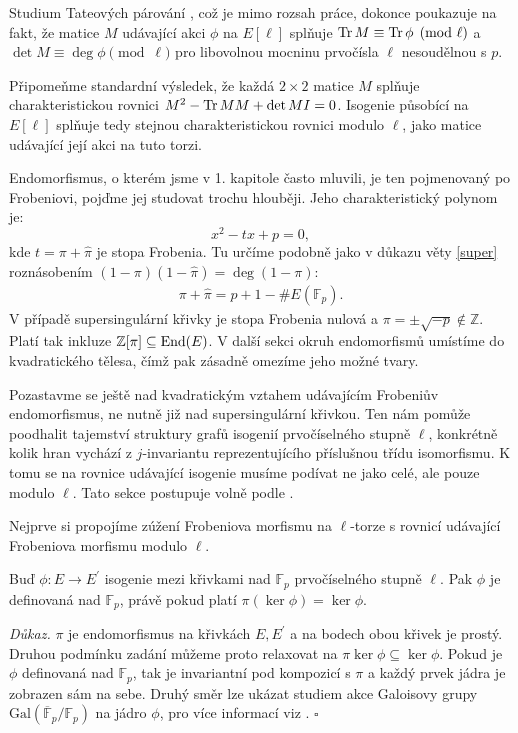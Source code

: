 \documentclass[12pt]{report}
\begin{document}
Studium Tateových párování \cite[Prop. III.8.6., Prop. V.2.3.]{Silverman}, což je mimo rozsah práce, dokonce poukazuje na fakt, že matice $M$ udávající akci $\phi$ na $E[\ell]$ splňuje $\operatorname{Tr} M \equiv \operatorname{Tr} \phi \pmod{\ell}$ a $\det M \equiv \deg \phi \pmod{\ell}$ pro libovolnou mocninu prvočísla $\ell$ nesoudělnou s $p$.

Připomeňme standardní výsledek, že každá $2 \times 2$ matice $M$ splňuje charakteristickou rovnici $M^2 - \operatorname{Tr} M M + \det M I = 0$. Isogenie působící na $E[\ell]$ splňuje tedy stejnou charakteristickou rovnici modulo $\ell$, jako matice udávající její akci na tuto torzi.

Endomorfismus, o kterém jsme v 1. kapitole často mluvili, je ten pojmenovaný po Frobeniovi, pojďme jej studovat trochu hlouběji. Jeho charakteristický polynom je:
\begin{equation*}
x^2 - tx + p = 0,
\end{equation*}
kde $t = \pi + \widehat{\pi}$ je stopa Frobenia. Tu určíme podobně jako v důkazu věty \ref{super} roznásobením $(1-\pi)(1-\widehat{\pi}) = \deg (1 - \pi)$:
\begin{align*}
\pi + \widehat{\pi} = p+1-\# E(\mathbb{F}_p).
\end{align*}
V případě supersingulární křivky je stopa Frobenia nulová a $\pi =  \pm \sqrt{-p} \not\in \mathbb{Z}$. Platí tak inkluze $\mathbb{Z}[\pi] \subseteq \operatorname{End}(E)$. V další sekci okruh endomorfismů umístíme do kvadratického tělesa, čímž pak zásadně omezíme jeho možné tvary.

Pozastavme se ještě nad kvadratickým vztahem udávajícím Frobeniův endomorfismus, ne nutně již nad supersingulární křivkou. Ten nám pomůže poodhalit tajemství struktury grafů isogenií prvočíselného stupně $\ell$, konkrétně kolik hran vychází z $j$-invariantu reprezentujícího příslušnou třídu isomorfismu. K tomu se na rovnice udávající isogenie musíme podívat ne jako celé, ale pouze modulo $\ell$. Tato sekce postupuje volně podle \cite[Sec. 6]{Schoof2}.

Nejprve si propojíme zúžení Frobeniova morfismu na $\ell$-torze s rovnicí udávající Frobeniova morfismu modulo $\ell$.

\begin{lemma}
Buď $\phi : E \longrightarrow E^\prime$ isogenie mezi křivkami nad $\mathbb{F}_p$ prvočíselného stupně $\ell$. Pak $\phi$ je definovaná nad $\mathbb{F}_p$, právě pokud platí $\pi (\ker \phi) = \ker \phi$.
\end{lemma}
\noindent \textit{Důkaz.} $\pi$ je endomorfismus na křivkách $E, E^\prime$ a na bodech obou křivek je prostý. Druhou podmínku zadání můžeme proto relaxovat na $\pi \ker \phi \subseteq \ker \phi$. Pokud je $\phi$ definovaná nad $\mathbb{F}_p$, tak je invariantní pod kompozicí s $\pi$ a každý prvek jádra je zobrazen sám na sebe. Druhý směr lze ukázat studiem akce Galoisovy grupy $\mathrm{Gal}(\overline{\mathbb{F}}_p /\mathbb{F}_p)$ na jádro $\phi$, pro více informací viz \cite[Lemma 24.]{Suchanek}. \hfill $\square$\\
\end{document}
